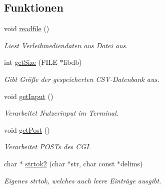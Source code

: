 \subsection*{Funktionen}
\begin{DoxyCompactItemize}
\item 
void \hyperlink{group___lend_lib_in_gabd7e68463503c5745a70e1d19c66f812}{readfile} ()\hypertarget{group___lend_lib_in_gabd7e68463503c5745a70e1d19c66f812}{}\label{group___lend_lib_in_gabd7e68463503c5745a70e1d19c66f812}

\begin{DoxyCompactList}\small\item\em Liest Verleihmediendaten aus Datei aus. \end{DoxyCompactList}\item 
int \hyperlink{group___lend_lib_in_ga6630e38513358b73fa2ce1c1f6cb71cb}{get\+Size} (F\+I\+LE $\ast$libdb)
\begin{DoxyCompactList}\small\item\em Gibt Größe der gespeicherten C\+S\+V-\/\+Datenbank aus. \end{DoxyCompactList}\item 
void \hyperlink{group___lend_lib_in_ga46d47190cb20b54826fb665f1859968f}{get\+Input} ()
\begin{DoxyCompactList}\small\item\em Verarbeitet Nutzerinput im Terminal. \end{DoxyCompactList}\item 
void \hyperlink{group___lend_lib_in_ga1817e73244fbbe5d1ae571f6010404ee}{get\+Post} ()\hypertarget{group___lend_lib_in_ga1817e73244fbbe5d1ae571f6010404ee}{}\label{group___lend_lib_in_ga1817e73244fbbe5d1ae571f6010404ee}

\begin{DoxyCompactList}\small\item\em Verarbeitet P\+O\+S\+Ts des C\+GI. \end{DoxyCompactList}\item 
char $\ast$ \hyperlink{group___lend_lib_in_gaccb55b34bbc589d5c47830fdcd889e17}{strtok2} (char $\ast$str, char const $\ast$delims)
\begin{DoxyCompactList}\small\item\em Eigenes strtok, welches auch leere Einträge ausgibt. \end{DoxyCompactList}\end{DoxyCompactItemize}
